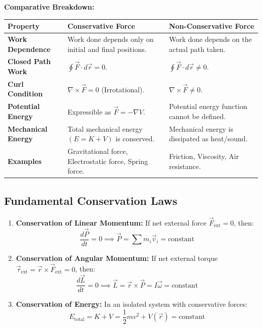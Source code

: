 \documentclass[12pt,a4paper]{article}
\begin{document}
\textbf{Comparative Breakdown:}\par\vspace{6pt}\noindent
\begin{tabularx}{\linewidth}{|B{3.5cm}|Y|Y|}
\hline
\textbf{Property} & \textbf{Conservative Force} & \textbf{Non-Conservative Force} \\
\hline
\textbf{Work Dependence} & Work done depends only on initial and final positions. & Work done depends on the actual path taken. \\
\hline
\textbf{Closed Path Work} & $\oint \vec{F} \cdot d\vec{r} = 0$. & $\oint \vec{F} \cdot d\vec{r} \neq 0$. \\
\hline
\textbf{Curl Condition} & $\nabla \times \vec{F} = 0$ (Irrotational). & $\nabla \times \vec{F} \neq 0$. \\
\hline
\textbf{Potential Energy} & Expressible as $\vec{F} = -\nabla V$. & Potential energy function cannot be defined. \\
\hline
\textbf{Mechanical Energy} & Total mechanical energy $(E = K + V)$ is conserved. & Mechanical energy is dissipated as heat/sound. \\
\hline
\textbf{Examples} & Gravitational force, Electrostatic force, Spring force. & Friction, Viscosity, Air resistance. \\
\hline
\end{tabularx}

\subsection{Fundamental Conservation Laws}

\begin{tcolorbox}[formulabox, title={\textbf{Conservation Theorems}}]
\begin{enumerate}[leftmargin=*, itemsep=4pt]
  \item \textbf{Conservation of Linear Momentum:} If net external force $\vec{F}_{\text{ext}} = 0$, then:
  \begin{equation}
  \frac{d\vec{P}}{dt} = 0 \implies \vec{P} = \sum m_i \vec{v}_i = \text{constant}
  \end{equation}
  \item \textbf{Conservation of Angular Momentum:} If net external torque $\vec{\tau}_{\text{ext}} = \vec{r} \times \vec{F}_{\text{ext}} = 0$, then:
  \begin{equation}
  \frac{d\vec{L}}{dt} = 0 \implies \vec{L} = \vec{r} \times \vec{P} = I\vec{\omega} = \text{constant}
  \end{equation}
  \item \textbf{Conservation of Energy:} In an isolated system with conservative forces:
  \begin{equation}
  E_{\text{total}} = K + V = \frac{1}{2} m v^2 + V(\vec{r}) = \text{constant}
  \end{equation}
\end{enumerate}
\end{tcolorbox}
\end{document}
